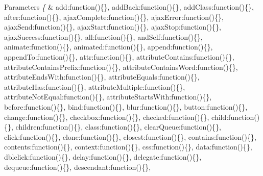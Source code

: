 \begin{DoxyParams}{Parameters}
{\em \{} & \textquotesingle{}add\textquotesingle{}\+:function()\{\}, \textquotesingle{}add\+Back\textquotesingle{}\+:function()\{\}, \textquotesingle{}add\+Class\textquotesingle{}\+:function()\{\}, \textquotesingle{}after\textquotesingle{}\+:function()\{\}, \textquotesingle{}ajax\+Complete\textquotesingle{}\+:function()\{\}, \textquotesingle{}ajax\+Error\textquotesingle{}\+:function()\{\}, \textquotesingle{}ajax\+Send\textquotesingle{}\+:function()\{\}, \textquotesingle{}ajax\+Start\textquotesingle{}\+:function()\{\}, \textquotesingle{}ajax\+Stop\textquotesingle{}\+:function()\{\}, \textquotesingle{}ajax\+Success\textquotesingle{}\+:function()\{\}, \textquotesingle{}all\textquotesingle{}\+:function()\{\}, \textquotesingle{}and\+Self\textquotesingle{}\+:function()\{\}, \textquotesingle{}animate\textquotesingle{}\+:function()\{\}, \textquotesingle{}animated\textquotesingle{}\+:function()\{\}, \textquotesingle{}append\textquotesingle{}\+:function()\{\}, \textquotesingle{}append\+To\textquotesingle{}\+:function()\{\}, \textquotesingle{}attr\textquotesingle{}\+:function()\{\}, \textquotesingle{}attribute\+Contains\textquotesingle{}\+:function()\{\}, \textquotesingle{}attribute\+Contains\+Prefix\textquotesingle{}\+:function()\{\}, \textquotesingle{}attribute\+Contains\+Word\textquotesingle{}\+:function()\{\}, \textquotesingle{}attribute\+Ends\+With\textquotesingle{}\+:function()\{\}, \textquotesingle{}attribute\+Equals\textquotesingle{}\+:function()\{\}, \textquotesingle{}attribute\+Has\textquotesingle{}\+:function()\{\}, \textquotesingle{}attribute\+Multiple\textquotesingle{}\+:function()\{\}, \textquotesingle{}attribute\+Not\+Equal\textquotesingle{}\+:function()\{\}, \textquotesingle{}attribute\+Starts\+With\textquotesingle{}\+:function()\{\}, \textquotesingle{}before\textquotesingle{}\+:function()\{\}, \textquotesingle{}bind\textquotesingle{}\+:function()\{\}, \textquotesingle{}blur\textquotesingle{}\+:function()\{\}, \textquotesingle{}button\textquotesingle{}\+:function()\{\}, \textquotesingle{}change\textquotesingle{}\+:function()\{\}, \textquotesingle{}checkbox\textquotesingle{}\+:function()\{\}, \textquotesingle{}checked\textquotesingle{}\+:function()\{\}, \textquotesingle{}child\textquotesingle{}\+:function()\{\}, \textquotesingle{}children\textquotesingle{}\+:function()\{\}, \textquotesingle{}class\textquotesingle{}\+:function()\{\}, \textquotesingle{}clear\+Queue\textquotesingle{}\+:function()\{\}, \textquotesingle{}click\textquotesingle{}\+:function()\{\}, \textquotesingle{}clone\textquotesingle{}\+:function()\{\}, \textquotesingle{}closest\textquotesingle{}\+:function()\{\}, \textquotesingle{}contains\textquotesingle{}\+:function()\{\}, \textquotesingle{}contents\textquotesingle{}\+:function()\{\}, \textquotesingle{}context\textquotesingle{}\+:function()\{\}, \textquotesingle{}css\textquotesingle{}\+:function()\{\}, \textquotesingle{}data\textquotesingle{}\+:function()\{\}, \textquotesingle{}dblclick\textquotesingle{}\+:function()\{\}, \textquotesingle{}delay\textquotesingle{}\+:function()\{\}, \textquotesingle{}delegate\textquotesingle{}\+:function()\{\}, \textquotesingle{}dequeue\textquotesingle{}\+:function()\{\}, \textquotesingle{}descendant\textquotesingle{}\+:function()\{\}, 
\end{DoxyParams}
